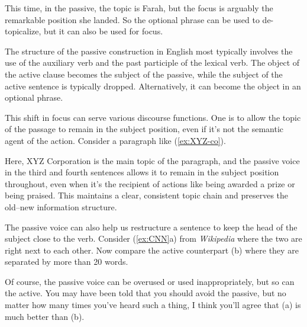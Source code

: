 \ea\label{ex:new-manager-by-phrase}
    \z
\z
{}
This time, in the passive, the topic is Farah, but the focus is arguably the remarkable position she landed. So the optional  phrase can be used to de-topicalize, but it can also be used for focus.

The structure of the passive construction in English most typically involves the use of the auxiliary verb  and the past participle of the lexical verb. The object of the active clause becomes the subject of the passive, while the subject of the active sentence is typically dropped. Alternatively, it can become the object in an optional  phrase.

This shift in focus can serve various discourse functions. One is to allow the topic of the passage to remain in the subject position, even if it's not the semantic agent of the action. Consider a paragraph like (\ref{ex:XYZ-co}).

\label{ex:XYZ-co}
\z
Here, XYZ Corporation is the main topic of the paragraph, and the passive voice in the third and fourth sentences allows it to remain in the subject position throughout, even when it's the recipient of actions like being awarded a prize or being praised. This maintains a clear, consistent topic chain and preserves the old--new information structure.

The passive voice can also help us restructure a sentence to keep the head of the subject close to the verb. Consider (\ref{ex:CNN}a) from \textit{Wikipedia} where the two are right next to each other. Now compare the active counterpart (b) where they are separated by more than 20 words.

\ea\label{ex:CNN}
    \ea[]{[A convolutional neural network \emph{architecture}]\cb~\ob \emph{is} formed by a stack of distinct layers that transform the input volume into an output volume (e.g. holding the class scores) through a differentiable function.]\\\hfill[\textsc{passive}]}
    \z
\z
Of course, the passive voice can be overused or used inappropriately, but so can the active. You may have been told that you should avoid the passive, but no matter how many times you've heard such a thing, I think you'll agree that (a) is much better than (b).

